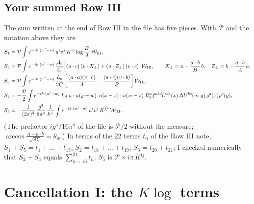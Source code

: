 \documentclass[10pt]{article}
\numberwithin{equation}{section}
\begin{document}
\subsection{Your summed Row III}
The sum written at the end of Row III in the file has five pieces. With $\mathcal{P}$ and the notation above they are
\begin{align}
S_{1}&=\mathcal{P}\int e^{-ik\cdot(w'-w)}\,u^{i}v^{j}\,K^{ij}\log\frac{B}{A}\;\mathcal{W}_{\rm III},\notag\\
S_{2}&=\mathcal{P}\int e^{-ik\cdot(w'-w)}\,\frac{\mathcal{A}_{0}}{C}\Big[(u\cdot c)\,(v\cdot X_{\perp})+(u\cdot Z_{\perp})\,(v\cdot c)\Big]\mathcal{W}_{\rm III},\qquad X_{\perp}=a-\frac{a\cdot b}{B}\,b,\quad Z_{\perp}=b-\frac{a\cdot b}{A}\,a,\notag\\
S_{3}&=\mathcal{P}\int e^{-ik\cdot(w'-w)}\,\frac{L_{d}}{2C}\left[\frac{(u\cdot a)(v\cdot c)}{A}-\frac{(u\cdot c)(v\cdot b)}{B}\right]\mathcal{W}_{\rm III},\notag\\
S_{4}&=-\frac{\mathcal{P}}{2}\int e^{-ik\cdot(w'-w)}\,L_{d}\;u\cdot n(y-w)\;\,n(x-z)\cdot n(w-z)\;\mathcal{D}_{0}^{a}f^{abd}U^{de}(x)\,\Delta U^{bc}(w,y)\,\rho^{e}(x)\rho^{c}(y),\notag\\
S_{5}&=-\frac{1}{(2\pi)^{3}}\,\frac{g^{4}}{8\pi^{4}}\,\frac{1}{k^{+}}\int e^{-ik\cdot(w'-w)}\,u^{i}v^{j}\,K^{ij}\;\mathcal{W}_{\rm III}. \label{eq:S15}
\end{align}
(The prefactor $ig^{4}/16\pi^{5}$ of the file is $\mathcal{P}/2$ without the measure; $\arccos\frac{A-a\cdot b}{\sqrt{AC}}=\theta_{w}$.) In terms of the 22 terms $t_{n}$ of the Row III note, $S_{1}+S_{5}=t_{1}+\dots+t_{15}$, $S_{2}=t_{16}+\dots+t_{19}$, $S_{3}=t_{20}+t_{21}$; I checked numerically that $S_{2}+S_{3}$ equals $\sum_{n=16}^{21}t_{n}$. $S_{5}$ is $\mathcal{P}\times i\pi\,K^{ij}$.

\section{Cancellation I: the $K\log$ terms}\label{sec:I}
\end{document}
